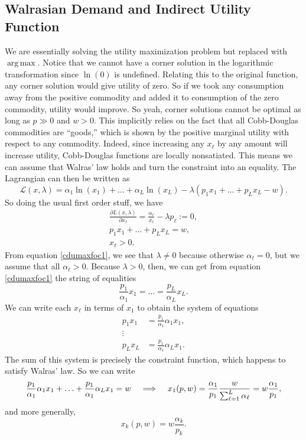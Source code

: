 \documentclass[12pt]{article}
\newcommand{\Lindent}{\hspace{.4cm} \Longrightarrow \hspace{.4cm}}
\DeclareMathOperator*{\argmax}{arg\,max}
\theoremstyle{definition}
\begin{document}
\subsection{Walrasian Demand and Indirect Utility Function}
	We are essentially solving the utility maximization problem but replaced with $\argmax$. Notice that we cannot have a corner solution in the logarithmic transformation since $\ln(0)$ is undefined. Relating this to the original function, any corner solution would give utility of zero. So if we took any consumption away from the positive commodity and added it to consumption of the zero commodity, utility would improve. So yeah, corner solutions cannot be optimal as long as $p \gg 0$ and $w > 0$. This implicitly relies on the fact that all Cobb-Douglas commodities are ``goods,'' which is shown by the positive marginal utility with respect to any commodity. Indeed, since increasing any $x_{\ell}$ by any amount will increase utility, Cobb-Douglas functions are locally nonsatiated. This means we can assume that Walras' law holds and turn the constraint into an equality. The Lagrangian can then be written as
	\[\mathcal{L}(x, \lambda) =  \alpha_1\ln(x_1) + ... + \alpha_L\ln(x_L) - \lambda(p_1x_1 + ... + p_Lx_L - w).	\]
So doing the usual first order stuff, we have
\begin{align}
	\frac{\partial L(x, \lambda)}{\partial x_{\ell}} = \frac{\alpha_{\ell}}{x_{\ell}} - \lambda p_{\ell} :=0, \label{cdumaxfoc1}\\	
	p_1x_1 + ... + p_Lx_L =w,\\
	x_{\ell} > 0.
\end{align}
From equation \ref{cdumaxfoc1}, we see that $\lambda \neq 0$ because otherwise $\alpha_{\ell}=0$, but we assume that all $\alpha_{\ell} > 0$. Because $\lambda > 0$, then, we can get from equation \ref{cdumaxfoc1} the string of equalities
	\[\frac{p_1}{\alpha_1}x_1 = \hdots= \frac{p_L}{\alpha_L}x_L.	\]
We can write each $x_{\ell}$ in terms of $x_1$ to obtain the system of equations
\begin{align*}
	p_1x_1 &= \frac{p_1}{\alpha_1}\alpha_1x_1,\\
	\vdots \\
	p_Lx_L &= \frac{p_1}{\alpha_1}\alpha_Lx_1.
\end{align*}
The sum of this system is precisely the constraint function, which happens to satisfy Walras' law. So we can write 
	\[\frac{p_1}{\alpha_1}\alpha_1 x_1 + \hdots + \frac{p_1}{\alpha_1}\alpha_Lx_1 = w \Lindent x_1(p,w)=\frac{\alpha_1}{p_1}\frac{w}{\sum_{\ell=1}^L \alpha_{\ell}} = w \frac{\alpha_1}{p_1},\]	
and more generally,
\[	x_k(p,w) = w\frac{\alpha_k}{p_k}.\]
\end{document}
